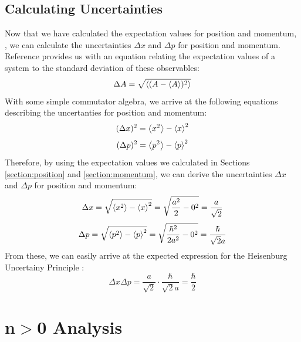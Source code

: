 \documentclass[a4paper]{article}
\begin{document}
\subsection{Calculating Uncertainties}
Now that we have calculated the expectation values for position and momentum, , we can calculate the uncertainties $\Delta x$ and $\Delta p$ for position and momentum. Reference \cite[\S3.3$\sim$p.123]{RefWorks:doc:60607e6a8f08266f5a4c458e} provides us with an equation relating the expectation values of a system to the standard deviation of these observables:
\begin{equation}
\Delta A=\sqrt{\expval{(A-\expval A)^2}}
\end{equation}
With some simple commutator algebra, we arrive at the following equations describing the uncertanties for position and momentum:
\begin{equation}\label{eq:Dx}
(\Delta x)^2=\expval{x^2}-\expval x^2
\end{equation}
\begin{equation}\label{eq:Dp}
  (\Delta p)^2=\expval{p^2}-\expval p^2
\end{equation}
Therefore, by using the expectation values we calculated in Sections \ref{section:position} and \ref{section:momentum}, we can derive the uncertainties $\Delta x$ and $\Delta p$ for position and momentum:
\begin{equation}
\Delta x = \sqrt{\expval{x^2}-\expval x^2} = \sqrt{ \frac{a^2}2 -0^2}=\frac a{\sqrt 2}
\end{equation}
\begin{equation}
\Delta p = \sqrt{\expval{p^2}-\expval p^2} = \sqrt{ \frac{\hbar^2}{2a^2} -0^2}=\frac\hbar{\sqrt 2 a}
\end{equation}
From these, we can easily arrive at the expected expression for the Heisenburg Uncertainy Principle \cite[Eq.63$\sim$p.113]{RefWorks:doc:606076f48f081b19e4859e9a}:
\begin{equation} \label{eq:dxdp}
\Delta x\Delta p=\frac a{\sqrt2}\cdot\frac\hbar{\sqrt2a}=\frac\hbar2
\end{equation}

\section{n$>$0 Analysis}
\end{document}
